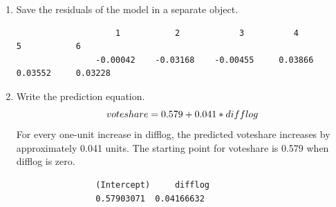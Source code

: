 \documentclass[12pt,letterpaper]{article}
\begin{document}
\begin{enumerate}
			
		\item Save the residuals of the model in a separate object.	
				\vspace{.25cm}
				 
				\begin{verbatim}
				    1           2            3          4           5           6 
				-0.00042    -0.03168    -0.00455     0.03866     0.03552     0.03228 
				\end{verbatim}
				\vspace{.4cm}
		
		
		\item Write the prediction equation.
				\vspace{.25cm}
				\[
				\boldmath
				voteshare = 0.579 + 0.041 * difflog
				\]
				For every one-unit increase in difflog, the predicted voteshare increases by approximately 0.041 units. The starting point for voteshare is 0.579 when difflog is zero.
				\vspace{.25cm}
				 
				\begin{verbatim}
				(Intercept)     difflog 
				0.57903071  0.04166632 
				\end{verbatim}			
			
	\end{enumerate}
	
\newpage
\end{document}
